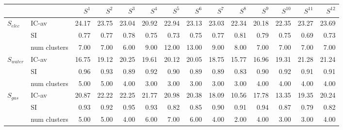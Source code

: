 \begin{tabular}{llrrrrrrrrrrrr}
\toprule
 &  & $S^{1}$ & $S^{2}$ & $S^{3}$ & $S^{4}$ & $S^{5}$ & $S^{6}$ & $S^{7}$ & $S^{8}$ & $S^{9}$ & $S^{10}$ & $S^{11}$ & $S^{12}$ \\
\midrule
\multirow[c]{3}{*}{$S_{elec}$} & IC-av & 24.17 & 23.75 & 23.04 & 20.92 & 22.94 & 23.13 & 23.03 & 22.34 & 20.18 & 22.35 & 23.27 & 23.69 \\
 & SI & 0.77 & 0.77 & 0.78 & 0.75 & 0.73 & 0.75 & 0.77 & 0.81 & 0.79 & 0.75 & 0.69 & 0.73 \\
 & num clusters & 7.00 & 7.00 & 6.00 & 9.00 & 12.00 & 13.00 & 9.00 & 8.00 & 7.00 & 7.00 & 7.00 & 7.00 \\
\multirow[c]{3}{*}{$S_{water}$} & IC-av & 16.75 & 19.12 & 20.25 & 19.61 & 20.12 & 20.05 & 18.75 & 15.77 & 16.96 & 19.31 & 21.28 & 21.24 \\
 & SI & 0.96 & 0.93 & 0.89 & 0.92 & 0.90 & 0.89 & 0.89 & 0.83 & 0.90 & 0.92 & 0.91 & 0.91 \\
 & num clusters & 5.00 & 5.00 & 4.00 & 3.00 & 3.00 & 3.00 & 3.00 & 3.00 & 4.00 & 4.00 & 4.00 & 4.00 \\
\multirow[c]{3}{*}{$S_{gas}$} & IC-av & 20.87 & 22.22 & 22.25 & 21.77 & 20.98 & 20.38 & 18.09 & 10.56 & 17.78 & 13.35 & 19.35 & 20.24 \\
 & SI & 0.93 & 0.92 & 0.95 & 0.93 & 0.82 & 0.85 & 0.90 & 0.91 & 0.94 & 0.87 & 0.79 & 0.82 \\
 & num clusters & 5.00 & 5.00 & 4.00 & 6.00 & 7.00 & 6.00 & 4.00 & 2.00 & 4.00 & 3.00 & 3.00 & 4.00 \\
\bottomrule
\end{tabular}
